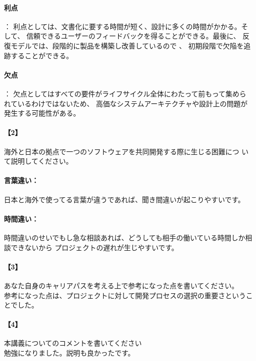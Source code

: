 \documentclass[20 pts]{article}
\begin{document}
\paragraph{利点}：
利点としては、文書化に要する時間が短く、設計に多くの時間がかかる。そして、
信頼できるユーザーのフィードバックを得ることができる。最後に、
反復モデルでは、段階的に製品を構築し改善しているので 、
初期段階で欠陥を追跡することができる。
\paragraph{欠点}：
欠点としてはすべての要件がライフサイクル全体にわたって前もって集められているわけではないため、
高価なシステムアーキテクチャや設計上の問題が発生する可能性がある。


\paragraph{【2】}海外と日本の拠点で一つのソフトウェアを共同開発する際に生じる困難につ
いて説明してください。\\


\paragraph{言葉違い：}
日本と海外で使ってる言葉が違うであれば、聞き間違いが起こりやすいです。

\paragraph{時間違い：}
時間違いのせいでもし急な相談あれば、どうしても相手の働いている時間しか相談できないから
プロジェクトの遅れが生じやすいです。


\newpage
\paragraph{【3】}あなた自身のキャリアパスを考える上で参考になった点を書いてください。\\
参考になった点は、プロジェクトに対して開発プロセスの選択の重要さということでした。



\paragraph{【4】}本講義についてのコメントを書いてください\\
勉強になりました。説明も良かったです。
\end{document}

